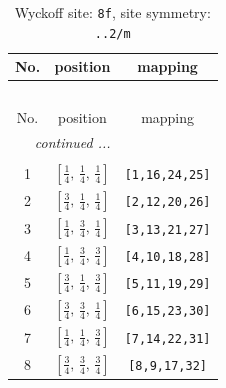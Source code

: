 \documentclass[fleqn,8pt]{jsarticle}
\begin{document}
\begin{longtable}{ccc}
\caption{Wyckoff site: {\tt 8f}, site symmetry: {\tt ..2/m}}
 \\
 \hline \hline
No. & position & mapping \\ \hline \endfirsthead

\multicolumn{2}{l}{\tablename\ \thetable{}} \\
 \hline \hline
No. & position & mapping \\ \hline \endhead

 \hline \hline
\multicolumn{2}{r}{\footnotesize\it continued ...} \\ \endfoot

 \hline \hline
\multicolumn{2}{r}{} \\ \endlastfoot

1 & $\left[ \frac{1}{4},\, \frac{1}{4},\, \frac{1}{4} \right]$ & {\tt [1,16,24,25]} \\ \hline
2 & $\left[ \frac{3}{4},\, \frac{1}{4},\, \frac{1}{4} \right]$ & {\tt [2,12,20,26]} \\ \hline
3 & $\left[ \frac{1}{4},\, \frac{3}{4},\, \frac{1}{4} \right]$ & {\tt [3,13,21,27]} \\ \hline
4 & $\left[ \frac{1}{4},\, \frac{3}{4},\, \frac{3}{4} \right]$ & {\tt [4,10,18,28]} \\ \hline
5 & $\left[ \frac{3}{4},\, \frac{1}{4},\, \frac{3}{4} \right]$ & {\tt [5,11,19,29]} \\ \hline
6 & $\left[ \frac{3}{4},\, \frac{3}{4},\, \frac{1}{4} \right]$ & {\tt [6,15,23,30]} \\ \hline
7 & $\left[ \frac{1}{4},\, \frac{1}{4},\, \frac{3}{4} \right]$ & {\tt [7,14,22,31]} \\ \hline
8 & $\left[ \frac{3}{4},\, \frac{3}{4},\, \frac{3}{4} \right]$ & {\tt [8,9,17,32]} \\
\end{longtable}
\renewcommand{\arraystretch}{1.2}
\end{document}
